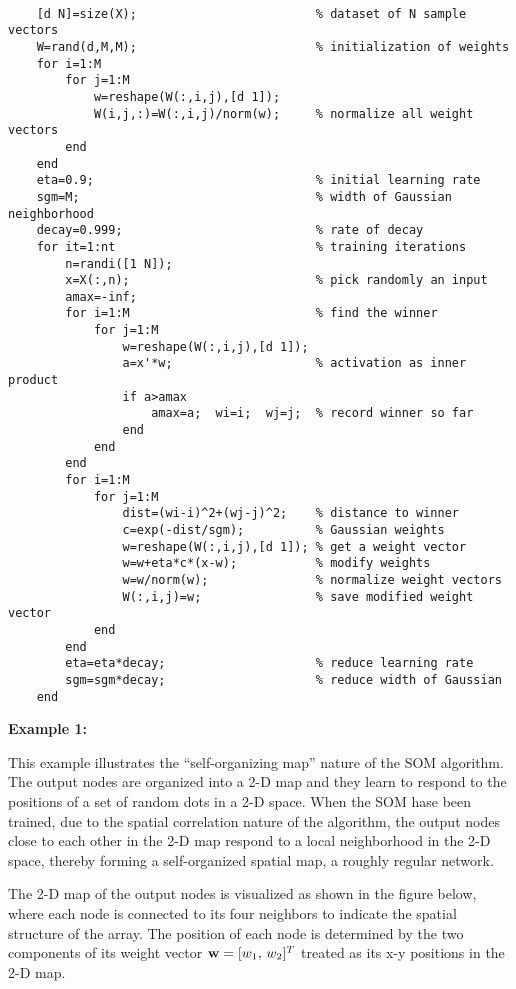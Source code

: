 \documentclass{article}
\begin{document}
\begin{verbatim}

    [d N]=size(X);                         % dataset of N sample vectors
    W=rand(d,M,M);                         % initialization of weights
    for i=1:M
        for j=1:M
            w=reshape(W(:,i,j),[d 1]);
            W(i,j,:)=W(:,i,j)/norm(w);     % normalize all weight vectors
        end
    end
    eta=0.9;                               % initial learning rate
    sgm=M;                                 % width of Gaussian neighborhood
    decay=0.999;                           % rate of decay
    for it=1:nt                            % training iterations
        n=randi([1 N]);                  
        x=X(:,n);                          % pick randomly an input
        amax=-inf;
        for i=1:M                          % find the winner 
            for j=1:M 
                w=reshape(W(:,i,j),[d 1]);
                a=x'*w;                    % activation as inner product
                if a>amax
                    amax=a;  wi=i;  wj=j;  % record winner so far
                end
            end
        end
        for i=1:M
            for j=1:M
                dist=(wi-i)^2+(wj-j)^2;    % distance to winner
                c=exp(-dist/sgm);          % Gaussian weights
                w=reshape(W(:,i,j),[d 1]); % get a weight vector
                w=w+eta*c*(x-w);           % modify weights
                w=w/norm(w);               % normalize weight vectors
                W(:,i,j)=w;                % save modified weight vector
            end
        end
        eta=eta*decay;                     % reduce learning rate
        sgm=sgm*decay;                     % reduce width of Gaussian
    end
\end{verbatim}

{\bf Example 1:} 

This example illustrates the ``self-organizing map'' nature of the 
SOM algorithm. The output nodes are organized into a 2-D map and 
they learn to respond to the positions of a set of random dots in a 
2-D space. When the SOM hase been trained, due to the spatial correlation 
nature of the algorithm, the output nodes close to each other in the
2-D map respond to a local neighborhood in the 2-D space, thereby 
forming a self-organized spatial map, a roughly regular network.

The 2-D map of the output nodes is visualized as shown in the 
figure below, where each node is connected to its four neighbors 
to indicate the spatial structure of the array. The position of 
each node is determined by the two components of its weight vector 
${\bf w}=[w_1,\,w_2]^T$ treated as its x-y positions in the 2-D 
map.
\end{document}
